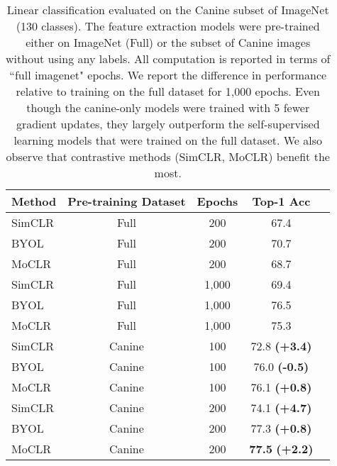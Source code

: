 \documentclass[final]{cvpr}
\newcommand\showdiff[1]{\textbf{\textcolor{nicergreen}{#1}}}
\newcommand\baseline{MoCLR}
\begin{document}
\begin{table}[t]
\caption{Linear classification evaluated on the Canine subset of ImageNet (130 classes). The feature extraction models were pre-trained either on ImageNet (Full) or the subset of Canine images without using any labels. All computation is reported in terms of ``full imagenet" epochs. We report the difference in performance relative to training on the full dataset for 1,000 epochs. Even though the canine-only models were trained with 5 fewer gradient updates, they largely outperform the self-supervised learning models that were trained on the full dataset. We also observe that contrastive methods (SimCLR, \baseline{}) benefit the most.}
\vspace{-4pt}
\label{tab:canine_results}
\begin{center}
\begin{small}
\begin{tabular}{lcccc}
\toprule
Method & Pre-training Dataset & Epochs  & Top-1 Acc \\
\midrule 
SimCLR & Full & \hspace{0.5em} 200  & 67.4  \\
BYOL & Full & \hspace{0.5em} 200  & 70.7  \\
\baseline{} & Full & \hspace{0.5em} 200  & 68.7  \\ 
\midrule 
SimCLR & Full & 1,000 & 69.4 \\
BYOL & Full & 1,000 & 76.5  \\
\baseline{} & Full & 1,000 & 75.3   \\ 
\midrule 
SimCLR & Canine & \hspace{0.25em} 100 & 72.8 \showdiff{(+3.4)}  \\
BYOL & Canine & \hspace{0.25em} 100 & 76.0 \textbf{(-0.5)}  \\
\baseline{} & Canine & \hspace{0.25em} 100  & 76.1 \showdiff{(+0.8)}  \\
\midrule 
SimCLR & Canine & \hspace{0.5em}  200 & 74.1 \showdiff{(+4.7)}  \\
BYOL & Canine & \hspace{0.5em} 200 & 77.3 \showdiff{(+0.8)}  \\
\baseline{} & Canine & \hspace{0.5em} 200 & \textbf{77.5} \showdiff{(+2.2)} \\
\bottomrule
\end{tabular}
\end{small}
\end{center}
\vspace{-10pt}
\end{table}
\end{document}
